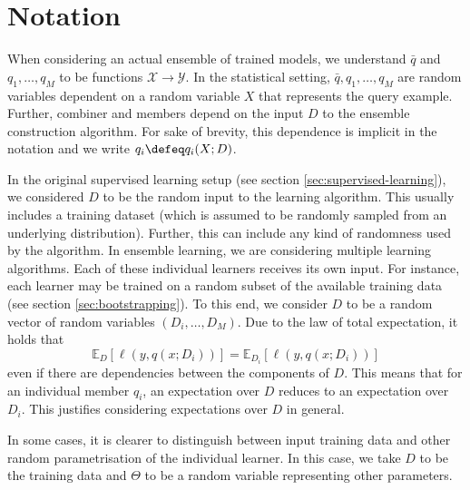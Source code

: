 \documentclass[
    a4paper, %
	fontsize=10pt, %
	twoside=false, %
]{kaobook}
\begin{document}
\section{Notation}
\label{sec:ensemble-learning-notation}
When considering an actual ensemble of trained models, we understand $\bar{q}$ and $q_{1}, \dots, q_{M}$ to be functions $\mathcal{X} \to \mathcal{Y}$. In the statistical setting, $\bar{q}, q_{1}, \dots, q_{M}$ are random variables dependent on a random variable $X$ that represents the query example. Further, combiner and members depend on the input $D$ to the ensemble construction algorithm. For sake of brevity, this dependence is implicit in the notation and we write $q_{i} \defeq q_{i}(X;D)$.

In the original supervised learning setup (see section \ref{sec:supervised-learning}), we considered $D$ to be the random input to the learning algorithm. This usually includes a training dataset (which is assumed to be randomly sampled from an underlying distribution). Further, this can include any kind of randomness used by the algorithm.
In ensemble learning, we are considering multiple learning algorithms. Each of these individual learners receives its own input. For instance, each learner may be trained on a random subset of the available training data (see section \ref{sec:bootstrapping}). To this end, we consider $D$ to be a random vector of random variables $(D_{i}, \dots, D_{M})$. 
Due to the law of total expectation, it holds that
$$
\mathbb{E}_{D}\left[ \ell(y, q(x; D_{i})) \right]  = \mathbb{E}_{D_{i}}\left[ \ell(y, q(x; D_{i})) \right] 
$$
even if there are dependencies between the components of $D$. This means that for an individual member $q_{i}$, an expectation over $D$ reduces to an expectation over $D_{i}$. This justifies considering expectations over $D$ in general.

In some cases, it is clearer to distinguish between input training data and other random parametrisation of the individual learner. In this case, we take $D$ to be the training data and $\Theta$ to be a random variable representing other parameters. 


\end{document}
